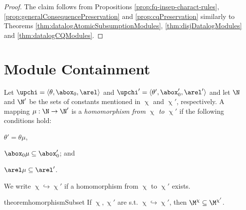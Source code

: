 \presJustifications*
\begin{proof}
The claim follows from Propositions \ref{prop:fq-insep-charact-rules}, 
\ref{prop:generalConsequencePreservation} and \ref{prop:cqPreservation}
similarly to Theorems \ref{thm:datalogAtomicSubsumptionModules}, 
\ref{thm:disjDatalogModules} and \ref{thm:datalogCQModules}.
\end{proof}












\section{Module Containment}

\begin{definition}
\label{def:blaHomomorphism}
Let $\upchi = \langle \theta, \abox_0, \arel \rangle$ and $\upchi' = \langle \theta', \abox'_0, \arel' \rangle$ and let $\N$ and $\N'$ be the sets of constants mentioned in $\upchi$ and $\upchi'$, respectively.
A mapping $\mu:\N \to \N'$ is a \emph{homomorphism from $\upchi$ to $\upchi'$} if 
the following conditions hold:
\begin{inparaenum}[(i)]
\item $\theta' = \theta\mu$,
\item $\abox_0\mu \subseteq \abox'_0 $; and 
\item $\arel\mu \subseteq \arel'$. 
\end{inparaenum}
We write
$\upchi\hookrightarrow\upchi'$ if a homomorphism from $\upchi$ to $\upchi'$ exists.
\end{definition}

\begin{restatable}{theorem}{homorphismSubset} \label{thm:homomorphism-subset}
  If $\upchi,\upchi'$ are s.t. $\upchi\hookrightarrow\upchi'$, then
  $\M^{\chi} \subseteq \M^{\chi'}$.
\end{restatable}

